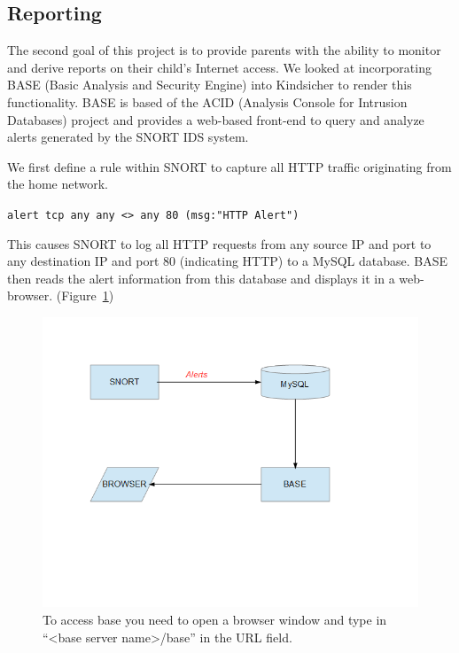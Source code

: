 
\subsection{Reporting}

The second goal of this project is to provide parents with the ability to
monitor and derive reports on their child's Internet access.
%
We looked at incorporating BASE (Basic Analysis and Security Engine) into Kindsicher to
render this functionality.
%
BASE is based of the ACID (Analysis Console for Intrusion Databases) project
and provides a web-based front-end to query and analyze alerts generated by
the SNORT IDS system.

We first define a rule within SNORT to capture all HTTP traffic originating
from the home network.

\verb+alert tcp any any <> any 80 (msg:"HTTP Alert")+

This causes SNORT to log all HTTP requests from any source IP and port to any
destination IP and port 80 (indicating HTTP) to a MySQL database.
%
BASE then reads the alert information from this database and displays it in a
web-browser. (Figure~\ref{fig:r1})

\begin{figure}[!t]
    \centering
    \includegraphics[width=\columnwidth]{figures/R1_BASE_Flow}
    \caption{To access base you need to open a browser window and type in ``<base server
name>/base'' in the URL field.}
    \label{fig:r1}
\end{figure}


